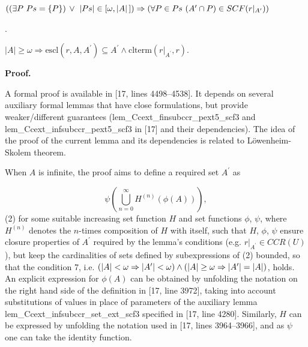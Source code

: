 \documentclass[10pt,a4paper]{amsart}
\begin{document}
$((\exists P\leavevmode\nobreak\ Ps=\{P\})\,\vee\leavevmode\nobreak\ |Ps|\in[%
\omega,|A|\,])\Rightarrow(\forall P\in Ps\leavevmode\nobreak\ (A^{\prime}\cap P%
)\in SCF(r|_{A^{\prime}}))$\par
 
 
 
\par{}. 
 
$|A|\geq\omega\Rightarrow\mathrm{escl}(r,A,A^{\prime})\subseteq A^{\prime}%
\wedge\mathrm{clterm}(r|_{A^{\prime}},r)$.\par
 
 
  
 
 
 
\par\medskip\noindent\textbf{Proof.}\par
 
 
A formal proof is available in [17, lines 4498–4538]. It depends on several auxiliary formal lemmas that have close formulations, but provide weaker/different guarantees (lem\_Ccext\_finsubccr\_pext5\_scf3 and lem\_Ccext\_infsubccr\_pext5\_scf3 in [17] and their dependencies). The idea of the proof of the current lemma and its dependencies is related to Löwenheim-Skolem theorem.\par
 
 
 
When $A$ is infinite, the proof aims to define a required set $A^{\prime}$ as\par
    \[\psi\left(\bigcup_{n=0}^{\infty}H^{(n)}(\phi(A))\right),\]  (2)   
for some suitable increasing set function $H$ and set functions $\phi$, $\psi$, where $H^{(n)}$ denotes the $n$-times composition of $H$ with itself, such that $H$, $\phi$, $\psi$ ensure closure properties of $A^{\prime}$ required by the lemma’s conditions (e.g. $r|_{A^{\prime}}\in CCR(U)$), but keep the cardinalities of sets defined by subexpressions of (2) bounded, so that the condition 7, i.e. $(|A|<\omega\Rightarrow|A^{\prime}|<\omega)\wedge(|A|\geq\omega\Rightarrow|A^{%
\prime}|=|A|)$, holds. An explicit expression for $\phi(A)$ can be obtained by unfolding the notation on the right hand side of the definition in [17, line 3972], taking into account substitutions of values in place of parameters of the auxiliary lemma lem\_Ccext\_infsubccr\_set\_ext\_scf3 specified in [17, line 4280]. Similarly, $H$ can be expressed by unfolding the notation used in [17, lines 3964–3966], and as $\psi$ one can take the identity function.\par
 
\end{document}
